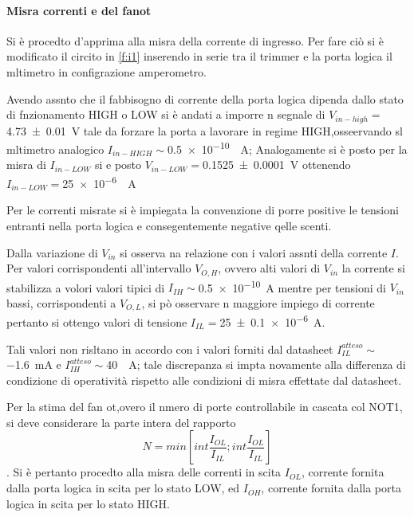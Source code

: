 \paragraph{Misra correnti e del fanot}
	Si è procedto d'apprima alla misra della corrente di ingresso.
	Per fare ciò si è modificato il circito in \figurename{ \ref{f:i1}} inserendo in serie tra il trimmer e la porta logica il mltimetro in configrazione amperometro.
	
	Avendo assnto che il fabbisogno di corrente della porta logica dipenda 	dallo stato di fnzionamento HIGH o LOW
	si è andati a imporre n segnale di $V_{in-high}=$\SI{4.73\pm 0.01}{\volt} tale da forzare la porta a lavorare in regime HIGH,osseervando sl mltimetro analogico $I_{in-HIGH}\sim$\SI{0.5e-10}{\mu \ampere};
	Analogamente si è posto per la misra di  $I_{in-LOW}$ si e posto  $V_{in-LOW}=$\SI{0.1525\pm 0.0001}{\volt} ottenendo $I_{in-LOW}=$\SI{25e-6}{\mu \ampere}
	
	
	Per le correnti misrate si è impiegata la convenzione di porre positive le tensioni entranti nella porta  logica e consegentemente negative qelle scenti.
	
	Dalla variazione di  $V_{in}$ si osserva na relazione con i valori assnti della corrente $I$.
	Per valori corrispondenti all'intervallo $V_{O,H}$, ovvero alti valori di 	$V_{in}$
	la corrente si stabilizza a volori valori tipici di $I_{IH}\sim$\SI{0.5 e-10}{\ampere}
	mentre per tensioni di $V_{in}$ bassi, corrispondenti a $V_{O,L}$, si pò
	osservare n maggiore impiego di corrente pertanto si ottengo valori di tensione $I_{IL}=$\SI{25 \pm 0.1 e-6}{\ampere}.
	
	Tali valori non risltano in accordo con i valori forniti dal datasheet 
	$I_{IL}^{atteso}\sim$\SI{-1.6}{\milli \ampere} e $I_{IH}^{atteso}\sim$\SI{40}{\mu \ampere}; tale discrepanza si impta novamente alla differenza di condizione di operatività rispetto alle condizioni di misra effettate dal datasheet.
	
	Per la stima del fan ot,overo il nmero di porte controllabile in cascata col NOT1, si deve considerare la parte intera del rapporto \begin{equation}
	N=min[int \frac{I_{OL}}{I_{IL}};int \frac{I_{OL}}{I_{IL}}]
		\end{equation}\label{eq:fan-o}
		.
	Si è pertanto procedto alla misra delle correnti in scita $I_{OL}$, corrente fornita dalla porta logica in scita per lo stato LOW, ed $I_{OH}$, corrente fornita dalla porta logica in scita per lo stato HIGH.
	
